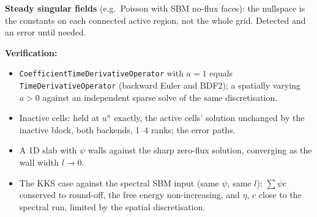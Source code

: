 \documentclass[11pt]{article}
\begin{document}
\textbf{Steady singular fields} (e.g.\ Poisson with SBM no-flux faces): the nullspace is the
constants on each connected active region, not the whole grid. Detected and an error until
needed.

\textbf{Verification:}
\begin{itemize}[leftmargin=*]
\item \texttt{CoefficientTimeDerivativeOperator} with $a = 1$ equals
\texttt{TimeDerivativeOperator} (backward Euler and BDF2); a spatially varying $a > 0$ against
an independent sparse solve of the same discretisation.
\item Inactive cells: held at $u^n$ exactly, the active cells' solution unchanged by the
inactive block, both backends, 1--4 ranks; the error paths.
\item A 1D slab with $\psi$ walls against the sharp zero-flux solution, converging as the wall
width $l \to 0$.
\item The KKS case against the spectral SBM input (same $\psi$, same $l$): $\sum\psi c$
conserved to round-off, the free energy non-increasing, and $\eta$, $c$ close to the spectral
run, limited by the spatial discretisation.
\end{itemize}
\end{document}
